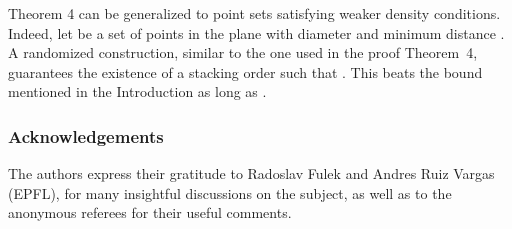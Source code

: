 \documentclass[11pt]{article}
\begin{document}
\medskip

Theorem 4 can be generalized to point sets satisfying weaker density conditions. Indeed, let  be a set of  points in the plane with diameter  and minimum distance . A randomized construction, similar to the one used in the proof Theorem~4, guarantees the existence of a stacking order  such that . This beats the  bound
mentioned in the Introduction as long as .

\medskip

\subsubsection*{Acknowledgements} The authors express their gratitude to Radoslav Fulek and Andres Ruiz Vargas (EPFL), for many insightful discussions on the subject, as well as to the anonymous referees for their useful comments.
\end{document}
